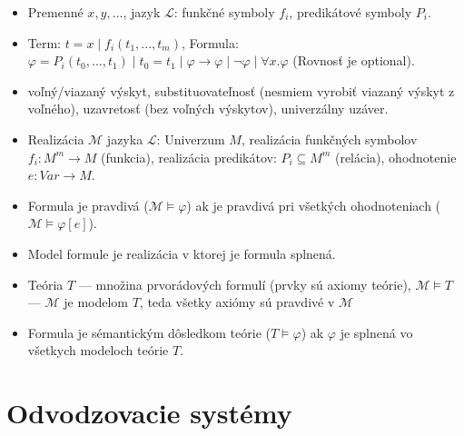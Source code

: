 \documentclass[paper=a4, fontsize=11pt]{scrartcl} %
\numberwithin{equation}{section} %
\numberwithin{figure}{section} %
\numberwithin{table}{section} %
\begin{document}
\begin{itemize}
		\begin{itemize}
			\item Premenné $x, y, ...$, jazyk $\mathcal{L}$: funkčné symboly $f_i$, predikátové symboly $P_i$.
			\item Term: $t = x \mid f_i(t_1, ..., t_m)$, Formula: $\varphi = P_i(t_0, ..., t_1) \mid t_0 = t_1 \mid \varphi \to \varphi \mid \neg \varphi \mid \forall x. \varphi$ (Rovnosť je optional).
			\item voľný/viazaný výskyt, substituovateľnosť (nesmiem vyrobiť viazaný výskyt z voľného), uzavretosť (bez voľných výskytov), univerzálny uzáver.
			\item Realizácia $\mathcal{M}$ jazyka $\mathcal{L}$: Univerzum $M$, realizácia funkčných symbolov $f_i : M^m \to M$ (funkcia), realizácia predikátov: $P_i \subseteq M^m$ (relácia), ohodnotenie $e: Var \to M$. 
			\item Formula je pravdivá ($\mathcal{M} \models \varphi$) ak je pravdivá pri všetkých ohodnoteniach ($\mathcal{M} \models \varphi[e]$).
			\item Model formule je realizácia v ktorej je formula splnená.
			\item Teória $T$ — množina prvorádových formulí (prvky sú axiomy teórie), $\mathcal{M} \models T$ — $\mathcal{M}$ je modelom $T$, teda všetky axiómy sú pravdivé v $\mathcal{M}$
			\item Formula je sémantickým dôsledkom teórie ($T \models \varphi$) ak $\varphi$ je splnená vo všetkych modeloch teórie $T$.
		\end{itemize}
	\end{itemize}
	
	\section{Odvodzovacie systémy}
	
\end{document}

